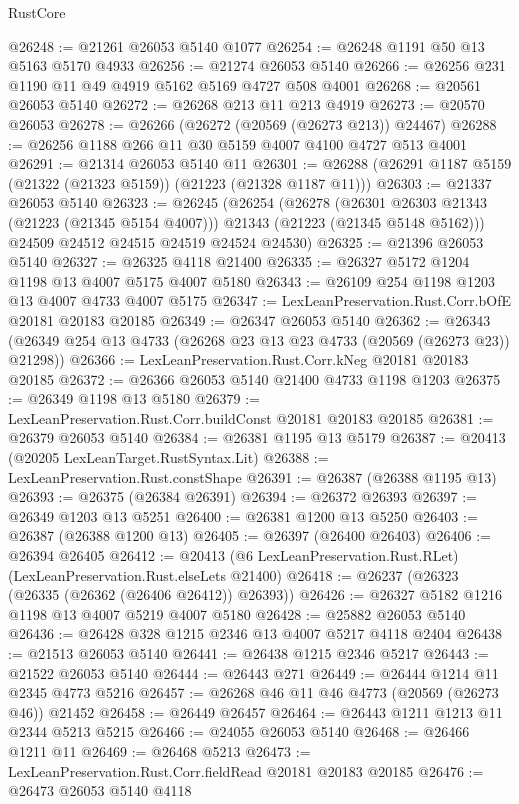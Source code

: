 \begin{lexlean}{RustCore}
\begin{coremodule}
@26248 := @21261 @26053 @5140 @1077
@26254 := @26248 @1191 @50 @13 @5163 @5170 @4933
@26256 := @21274 @26053 @5140
@26266 := @26256 @231 @1190 @11 @49 @4919 @5162 @5169 @4727 @508 @4001
@26268 := @20561 @26053 @5140
@26272 := @26268 @213 @11 @213 @4919
@26273 := @20570 @26053
@26278 := @26266 (@26272 (@20569 (@26273 @213)) @24467)
@26288 := @26256 @1188 @266 @11 @30 @5159 @4007 @4100 @4727 @513 @4001
@26291 := @21314 @26053 @5140 @11
@26301 := @26288 (@26291 @1187 @5159 (@21322 (@21323 @5159)) (@21223 (@21328 @1187 @11)))
@26303 := @21337 @26053 @5140
@26323 := @26245
    (@26254
      (@26278
        (@26301 @26303 @21343 (@21223 (@21345 @5154 @4007)))
        @21343
        (@21223 (@21345 @5148 @5162)))
      @24509
      @24512
      @24515
      @24519
      @24524
      @24530)
@26325 := @21396 @26053 @5140
@26327 := @26325 @4118 @21400
@26335 := @26327 @5172 @1204 @1198 @13 @4007 @5175 @4007 @5180
@26343 := @26109 @254 @1198 @1203 @13 @4007 @4733 @4007 @5175
@26347 := LexLeanPreservation.Rust.Corr.bOfE @20181 @20183 @20185
@26349 := @26347 @26053 @5140
@26362 := @26343 (@26349 @254 @13 @4733 (@26268 @23 @13 @23 @4733 (@20569 (@26273 @23)) @21298))
@26366 := LexLeanPreservation.Rust.Corr.kNeg @20181 @20183 @20185
@26372 := @26366 @26053 @5140 @21400 @4733 @1198 @1203
@26375 := @26349 @1198 @13 @5180
@26379 := LexLeanPreservation.Rust.Corr.buildConst @20181 @20183 @20185
@26381 := @26379 @26053 @5140
@26384 := @26381 @1195 @13 @5179
@26387 := @20413 (@20205 LexLeanTarget.RustSyntax.Lit)
@26388 := LexLeanPreservation.Rust.constShape
@26391 := @26387 (@26388 @1195 @13)
@26393 := @26375 (@26384 @26391)
@26394 := @26372 @26393
@26397 := @26349 @1203 @13 @5251
@26400 := @26381 @1200 @13 @5250
@26403 := @26387 (@26388 @1200 @13)
@26405 := @26397 (@26400 @26403)
@26406 := @26394 @26405
@26412 := @20413 (@6 LexLeanPreservation.Rust.RLet) (LexLeanPreservation.Rust.elseLets @21400)
@26418 := @26237 (@26323 (@26335 (@26362 (@26406 @26412)) @26393))
@26426 := @26327 @5182 @1216 @1198 @13 @4007 @5219 @4007 @5180
@26428 := @25882 @26053 @5140
@26436 := @26428 @328 @1215 @2346 @13 @4007 @5217 @4118 @2404
@26438 := @21513 @26053 @5140
@26441 := @26438 @1215 @2346 @5217
@26443 := @21522 @26053 @5140
@26444 := @26443 @271
@26449 := @26444 @1214 @11 @2345 @4773 @5216
@26457 := @26268 @46 @11 @46 @4773 (@20569 (@26273 @46)) @21452
@26458 := @26449 @26457
@26464 := @26443 @1211 @1213 @11 @2344 @5213 @5215
@26466 := @24055 @26053 @5140
@26468 := @26466 @1211 @11
@26469 := @26468 @5213
@26473 := LexLeanPreservation.Rust.Corr.fieldRead @20181 @20183 @20185
@26476 := @26473 @26053 @5140 @4118

\end{coremodule}
\end{lexlean}
